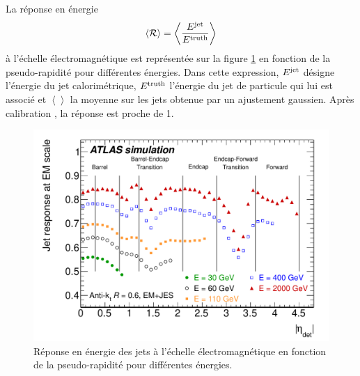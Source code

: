 La r\'eponse en \'energie
\[\langle\mathcal{R} \rangle=\left<\frac{E^{\rm jet}}{E^{\rm truth}}\right>\]
 \`a l'\'echelle \'electromagn\'etique est repr\'esent\'ee sur la figure \ref{fig:fig_09_responseEMscaleVsEta} en fonction de la pseudo-rapidit\'e pour diff\'erentes \'energies. Dans cette expression, $E^{\rm jet}$ d\'esigne l'\'energie du jet calorim\'etrique, $E^{\rm truth}$ l'\'energie du jet de particule qui lui est associ\'e et $\left<\right>$ la moyenne sur les jets obtenue par un ajustement gaussien. Apr\`es calibration \EMJES, la r\'eponse est proche de 1. %

\begin{figure}[!h]
	\centering
	\includegraphics[scale=0.5]{figures/fig_09_responseEMscaleVsEta.pdf}
	\caption{R\'eponse en \'energie des jets \`a l'\'echelle \'electromagn\'etique en fonction de la pseudo-rapidit\'e pour diff\'erentes \'energies.}
	\label{fig:fig_09_responseEMscaleVsEta}
\end{figure}

